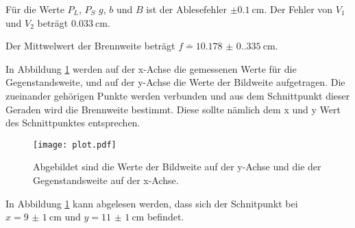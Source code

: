 Für die Werte $P_L$, $P_S$ $g$, $b$ und $B$ ist der Ablesefehler $\pm \qty{0.1}{\centi\meter}$.
Der Fehler von $V_1$ und $V_2$ beträgt $\qty{0.033}{\centi\meter}$.

Der Mittwelwert der Brennweite beträgt $f \bar=\qty{10.178(0.335)}{\centi\meter}$.


In Abbildung \ref{fig:brenn} werden auf der x-Achse die gemessenen Werte für die Gegenstandsweite, und auf der y-Achse die Werte der Bildweite aufgetragen.
Die zueinander gehörigen Punkte werden verbunden und aus dem Schnittpunkt dieser Geraden wird die Brennweite bestimmt.
Diese sollte nämlich dem x und y Wert des Schnittpunktes entsprechen.

\begin{figure}[H]
  \centering
  \texttt{[image: plot.pdf]}
  \caption{Abgebildet sind die Werte der Bildweite auf der y-Achse und die der Gegenstandsweite auf der x-Achse.}
  \label{fig:brenn}
\end{figure}

In Abbildung \ref{fig:brenn} kann abgelesen werden, dass sich der Schnitpunkt bei $x=\qty{9(1)}{\centi\meter}$ und $y=\qty{11(1)}{\centi\meter}$ befindet.


